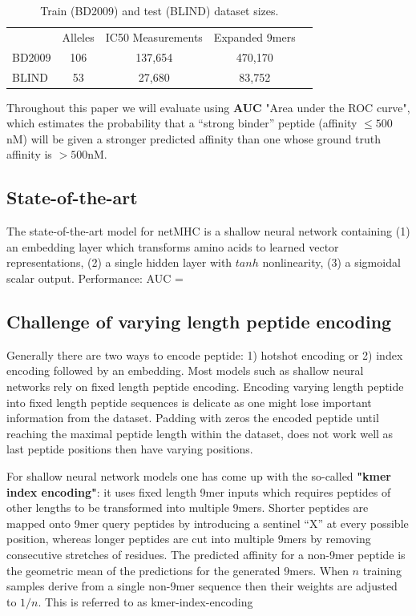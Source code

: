 \documentclass{article} %
\begin{document}
\begin{table}[h!]
\centering
\begin{tabular}{l||cccc}
{} & Alleles &  IC50 Measurements & Expanded 9mers \\

BD2009 &     106 &                           137,654 &        470,170 \\
BLIND  &      53 &                           27,680 &         83,752 \\

\end{tabular}
\caption{Train (BD2009) and test (BLIND) dataset sizes.}
\label{tab:datasets}
\end{table}

Throughout this paper we will evaluate using {\bf AUC} "Area under the ROC curve", which estimates the probability that a ``strong binder'' peptide (affinity $\leq 500$nM) will be given a stronger predicted affinity than one whose ground truth affinity is $>500$nM.

\subsection{State-of-the-art}

The state-of-the-art model for netMHC is a shallow neural network containing (1) an embedding layer which transforms amino acids to learned vector representations, (2) a single hidden layer with $tanh$ nonlinearity, (3) a sigmoidal scalar output. Performance: AUC = 

\subsection{Challenge of varying length peptide encoding}
Generally there are two ways to encode peptide: 1) hotshot encoding or 2) index encoding followed by an embedding. Most models such as shallow neural networks rely on fixed length peptide encoding. Encoding varying length peptide into fixed length peptide sequences is delicate as one might lose important information from the dataset. Padding with zeros the encoded peptide until reaching the maximal peptide length within the dataset, does not work well as last peptide positions then have varying positions. 

For shallow neural network models one has come up with the so-called {\bf"kmer index encoding"}: it
uses fixed length 9mer inputs which requires peptides of other lengths to be transformed into multiple 9mers. Shorter peptides are mapped onto 9mer query peptides by introducing a sentinel ``X'' at every possible position, whereas longer peptides are cut into multiple 9mers by removing consecutive stretches of residues. The predicted affinity for a non-9mer peptide is the geometric mean of the predictions for the generated 9mers. When $n$ training samples derive from a single non-9mer sequence then their weights are adjusted to $1/n$. This is referred to as kmer-index-encoding
\end{document}
